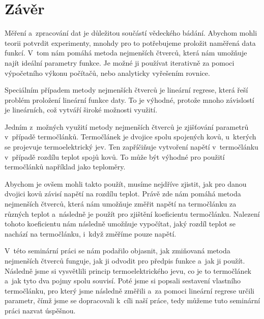 \section{Závěr}
Měření a~zpracování dat je důležitou součástí vědeckého bádání. Abychom mohli
teorii potvrdit experimenty, mnohdy pro to potřebujeme proložit naměřená data
funkcí. V~tom nám pomáhá metoda nejmenších čtverců, která nám umožňuje najít
ideální parametry funkce. Je možné ji používat iterativně za pomoci výpočetního
výkonu počítačů, nebo analyticky vyřešením rovnice.

Speciálním případem metody nejmenších čtverců je lineární regrese, která řeší
problém proložení lineární funkce daty. To je výhodné, protože mnoho závislostí
je lineárních, což vytváří široké možnosti využití.

Jedním z~možných využití metody nejmenších čtverců je zjišťování parametrů
v~případě termočlánků. Termočlánek je dvojice spolu spojených kovů, u~kterých se
projevuje termoelektrický jev. Ten zapříčiňuje vytvoření napětí v~termočlánku
v~případě rozdílu teplot spojů kovů. To může být výhodné pro použití
termočlánků například jako teploměry. 

Abychom je ovšem mohli takto použít, musíme nejdříve zjistit, jak pro danou
dvojici kovů závisí napětí na rozdílu teplot. Právě zde nám pomáhá metoda
nejmenších čtverců, která nám umožňuje změřit napětí na termočlánku za různých
teplot a~následně je použít pro zjištění koeficientu termočlánku.
Nalezení tohoto koeficientu nám následně umožňuje vypočítat, jaký rozdíl teplot
se nachází na termočlánku, i~když změříme pouze napětí.

V~této seminární práci se nám podařilo objasnit, jak zmiňovaná metoda
nejmenších čtverců funguje, jak ji odvodit pro předpis funkce a~jak ji použít.
Následně jsme si vysvětlili princip termoelektrického jevu, co je to
termočlánek a~jak tyto dva pojmy spolu souvisí. Poté jsme si popsali sestavení
vlastního termočlánku, pro který jsme následně změřili a~za pomoci lineární
regrese určili parametr, čímž jsme se dopracovali k~cíli naší práce, tedy
můžeme tuto seminární práci nazvat úspěšnou.
